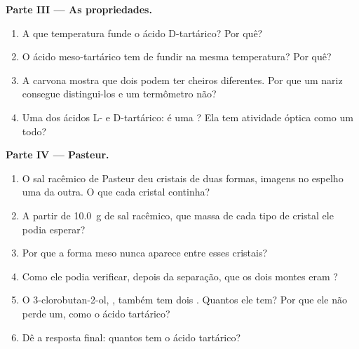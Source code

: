 \begin{problem}
\medskip
\noindent\textbf{Parte III --- As propriedades.}
\begin{enumerate}[resume]
  \item A que temperatura funde o ácido D-tartárico? Por quê?
  \item O ácido meso-tartárico tem de fundir na mesma temperatura? Por
        quê?
  \item A carvona mostra que dois  podem ter cheiros
        diferentes. Por que um nariz consegue distingui-los e um
        termômetro não?
  \item Uma  dos ácidos L- e D-tartárico: é uma
        ? Ela tem atividade óptica como um todo?
\end{enumerate}

\medskip
\noindent\textbf{Parte IV --- Pasteur.}
\begin{enumerate}[resume]
  \item O sal racêmico de Pasteur deu cristais de duas formas, imagens no
        espelho uma da outra. O que cada cristal continha?
  \item A partir de \qty{10.0}{g} de sal racêmico, que massa de cada tipo
        de cristal ele podia esperar?
  \item Por que a forma meso nunca aparece entre esses cristais?
  \item Como ele podia verificar, depois da separação, que os dois montes
        eram ?
  \item O 3-clorobutan-2-ol, , também tem dois
        . Quantos  ele tem? Por que
        ele não perde um, como o ácido tartárico?
  \item Dê a resposta final: quantos  tem o ácido
        tartárico?
\end{enumerate}
\end{problem}
